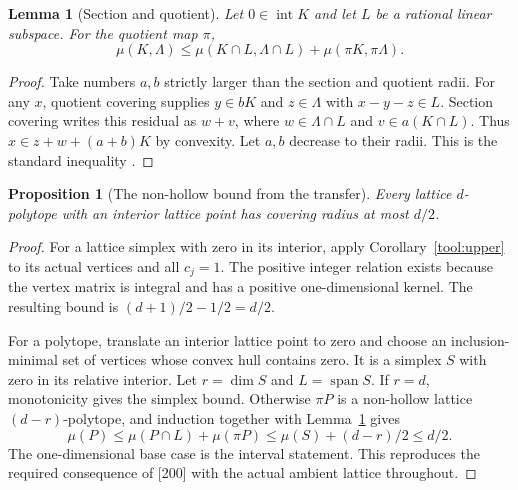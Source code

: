 \documentclass[11pt,a4paper]{article}
\newtheorem{lemma}[theorem]{Lemma}
\newtheorem{proposition}[theorem]{Proposition}
\theoremstyle{remark}\newtheorem{remark}[theorem]{Remark}
\DeclareMathOperator{\inter}{int}
\begin{document}
\begin{lemma}[Section and quotient]\label{tool:section}
Let $0\in\inter K$ and let $L$ be a rational linear subspace.
For the quotient map $\pi$,
\[
 \mu(K,\Lambda)\le
 \mu(K\cap L,\Lambda\cap L)+\mu(\pi K,\pi\Lambda).
\]
\end{lemma}
\begin{proof}
Take numbers $a,b$ strictly larger than the section and quotient
radii. For any $x$, quotient covering supplies $y\in bK$ and
$z\in\Lambda$ with $x-y-z\in L$. Section covering writes this
residual as $w+v$, where $w\in\Lambda\cap L$ and $v\in a(K\cap L)$.
Thus $x\in z+w+(a+b)K$ by convexity. Let $a,b$ decrease to their
radii. This is the standard inequality \cite[Lemma 2.1]{CSS}.
\end{proof}

\begin{proposition}[The non-hollow bound from the transfer]
\label{tool:nonhollow}
Every lattice $d$-polytope with an interior lattice point has
covering radius at most $d/2$.
\end{proposition}
\begin{proof}
For a lattice simplex with zero in its interior, apply
Corollary~\ref{tool:upper} to its actual vertices and all $c_j=1$.
The positive integer relation exists because the vertex matrix is
integral and has a positive one-dimensional kernel. The resulting
bound is $(d+1)/2-1/2=d/2$.

For a polytope, translate an interior lattice point to zero and
choose an inclusion-minimal set of vertices whose convex hull
contains zero. It is a simplex $S$ with zero in its relative
interior. Let $r=\dim S$ and $L=\operatorname{span}S$. If $r=d$,
monotonicity gives the simplex bound. Otherwise $\pi P$ is a
non-hollow lattice $(d-r)$-polytope, and induction together with
Lemma~\ref{tool:section} gives
\[
 \mu(P)\le\mu(P\cap L)+\mu(\pi P)
 \le\mu(S)+(d-r)/2\le d/2.
\]
The one-dimensional base case is the interval statement. This
reproduces the required consequence of [200] with the actual
ambient lattice throughout.
\end{proof}
\end{document}
